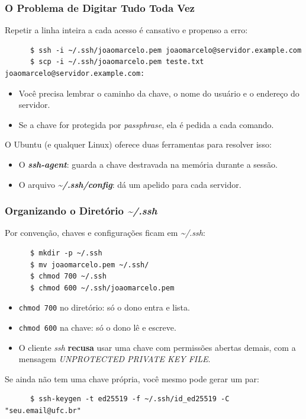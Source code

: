 \documentclass{beamer}
\begin{document}
\begin{frame}[fragile]
   \frametitle{O Problema de Digitar Tudo Toda Vez}
   Repetir a linha inteira a cada acesso é cansativo e propenso a erro:
   \begin{verbatim}
      $ ssh -i ~/.ssh/joaomarcelo.pem joaomarcelo@servidor.example.com
      $ scp -i ~/.ssh/joaomarcelo.pem teste.txt joaomarcelo@servidor.example.com:
   \end{verbatim}
   \begin{itemize}
      \item Você precisa lembrar o caminho da chave, o nome do usuário e o endereço do servidor.
      \item Se a chave for protegida por \textit{passphrase}, ela é pedida a cada comando.
   \end{itemize}
   O Ubuntu (e qualquer Linux) oferece duas ferramentas para resolver isso:
   \begin{itemize}
      \item O \textbf{\textit{ssh-agent}}: guarda a chave destravada na memória durante a sessão.
      \item O arquivo \textbf{\textit{\textasciitilde/.ssh/config}}: dá um apelido para cada servidor.
   \end{itemize}
\end{frame}

\begin{frame}[fragile]
   \frametitle{Organizando o Diretório \textit{\textasciitilde/.ssh}}
   Por convenção, chaves e configurações ficam em \textit{\textasciitilde/.ssh}:
   \begin{verbatim}
      $ mkdir -p ~/.ssh
      $ mv joaomarcelo.pem ~/.ssh/
      $ chmod 700 ~/.ssh
      $ chmod 600 ~/.ssh/joaomarcelo.pem
   \end{verbatim}
   \begin{itemize}
      \item \texttt{chmod 700} no diretório: só o dono entra e lista.
      \item \texttt{chmod 600} na chave: só o dono lê e escreve.
      \item O cliente \textit{ssh} \textbf{recusa} usar uma chave com permissões abertas demais, com a mensagem \textit{UNPROTECTED PRIVATE KEY FILE}.
   \end{itemize}
   Se ainda não tem uma chave própria, você mesmo pode gerar um par:
   \begin{verbatim}
      $ ssh-keygen -t ed25519 -f ~/.ssh/id_ed25519 -C "seu.email@ufc.br"
   \end{verbatim}
\end{frame}
\end{document}
